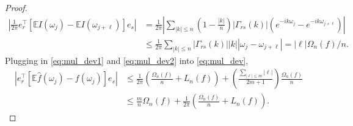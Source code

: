 \begin{proof}
\begin{equation}
\label{eq:mul_dev2}
\begin{aligned}
\left|\frac{1}{2\pi} e_r^\top \left[\mathbb{E} I(\omega_j) - \mathbb{E} I(\omega_{j+\ell}) \right]e_s\right| &= \frac{1}{2\pi}\left|\sum_{|k|\le n} \left(1-\frac{|k|}{n}\right) |\Gamma_{rs}(k)| (e^{-ik\omega_j} - e^{-i k\omega_{j+\ell}})\right|\\
&\le \frac{1}{2\pi} \sum_{|k|\le n} |\Gamma_{rs}(k)| |k||\omega_j - \omega_{j+\ell}| =  |\ell| \Omega_n(f)/n. 
\end{aligned}
\end{equation}
Plugging in \eqref{eq:mul_dev1} and \eqref{eq:mul_dev2}  into \eqref{eq:mul_dev},  
\begin{equation*}
\begin{aligned}
\left|e_r^\top \left[\mathbb{E}\hat{f}(\omega_j) - f(\omega_j)\right]e_s\right| &\le \frac{1}{2\pi}\left(\frac{\Omega_n(f)}{n} + L_n(f)\right)+ \left(\frac{\sum_{|\ell|\le m} |\ell|}{2m+1}\right)\frac{\Omega_n(f)}{n}\\
&\le \frac{m}{n}\Omega_n(f) + \frac{1}{2\pi}\left(\frac{\Omega_n(f)}{n}+L_n(f)\right).\nonumber
\end{aligned}
\end{equation*}
\end{proof}


